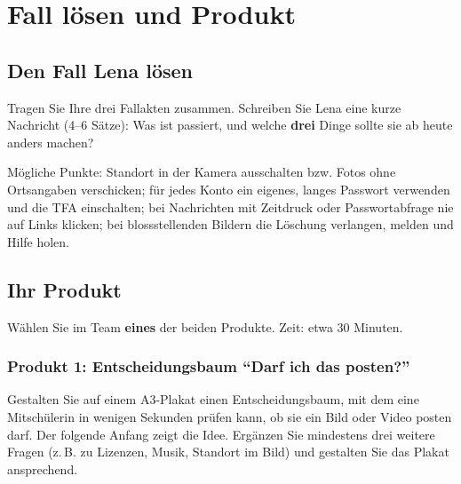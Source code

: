 \chapter{Fall lösen und Produkt}\label{ch:produkt}

\section{Den Fall Lena lösen}\label{sec:fall_loesen}

\begin{myexercise}
	Tragen Sie Ihre drei Fallakten zusammen. Schreiben Sie Lena eine kurze Nachricht (4--6 Sätze):
	Was ist passiert, und welche \textbf{drei} Dinge sollte sie ab heute anders machen?
	\schreibzeile
	\schreibzeile
	\schreibzeile
	\schreibzeile
	\schreibzeile
	\begin{myanswer}
		Mögliche Punkte: Standort in der Kamera ausschalten bzw. Fotos ohne Ortsangaben verschicken;
		für jedes Konto ein eigenes, langes Passwort verwenden und die \gls{TFA} einschalten;
		bei Nachrichten mit Zeitdruck oder Passwortabfrage nie auf Links klicken;
		bei blossstellenden Bildern die Löschung verlangen, melden und Hilfe holen.
	\end{myanswer}
\end{myexercise}

\section{Ihr Produkt}\label{sec:produkt_waehlen}

Wählen Sie im Team \textbf{eines} der beiden Produkte. Zeit: etwa 30 Minuten.

\subsection{Produkt 1: Entscheidungsbaum \enquote{Darf ich das posten?}}

Gestalten Sie auf einem A3-Plakat einen Entscheidungsbaum, mit dem eine Mitschülerin in wenigen Sekunden prüfen kann, ob sie ein Bild oder Video posten darf.
Der folgende Anfang zeigt die Idee. Ergänzen Sie mindestens drei weitere Fragen (z.\,B. zu Lizenzen, Musik, Standort im Bild) und gestalten Sie das Plakat ansprechend.

